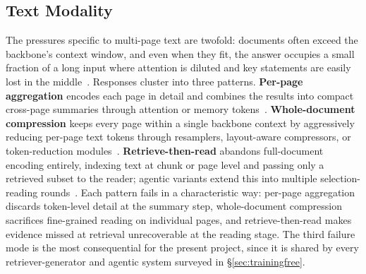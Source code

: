 \documentclass[11pt]{article}
\begin{document}
\subsection{Text Modality}
The pressures specific to multi-page text are twofold: documents often exceed the backbone's context window, and even when they fit, the answer occupies a small fraction of a long input where attention is diluted and key statements are easily lost in the middle~\cite{liu2024lost}. Responses cluster into three patterns. \textbf{Per-page aggregation} encodes each page in detail and combines the results into compact cross-page summaries through attention or memory tokens~\cite{tito2023hierarchical,blau2024gram,borchmann2025arctic}. \textbf{Whole-document compression} keeps every page within a single backbone context by aggressively reducing per-page text tokens through resamplers, layout-aware compressors, or token-reduction modules~\cite{hu2025mplug2,yu2024texthawk2}. \textbf{Retrieve-then-read} abandons full-document encoding entirely, indexing text at chunk or page level and passing only a retrieved subset to the reader; agentic variants extend this into multiple selection-reading rounds~\cite{zhang2024cream,shin2025multidocfusion,sun2025docagent,han2025mdocagent}. Each pattern fails in a characteristic way: per-page aggregation discards token-level detail at the summary step, whole-document compression sacrifices fine-grained reading on individual pages, and retrieve-then-read makes evidence missed at retrieval unrecoverable at the reading stage. The third failure mode is the most consequential for the present project, since it is shared by every retriever-generator and agentic system surveyed in \S\ref{sec:trainingfree}.
\end{document}
